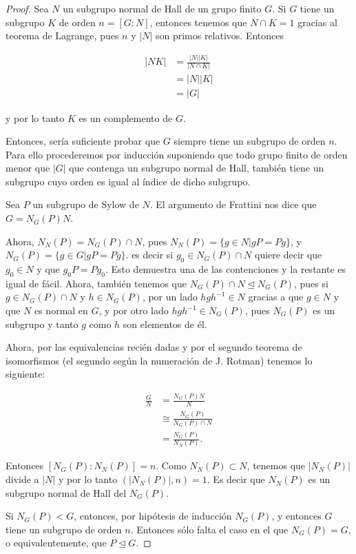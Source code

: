 \begin{proof}
    Sea $N$ un subgrupo normal de Hall de un grupo finito $G$. Si $G$ tiene un subgrupo $K$ de orden $n = [G:N]$, entonces
    tenemos que $N \cap K = 1$ gracias al teorema de Lagrange, pues $n$ y $|N|$ son primos relativos. Entonces
    
    \begin{align}
        |NK|    &= \frac{|N||K|}{|N \cap K|}    \\
                &= |N||K|                       \\
                &= |G| 
    \end{align}
    
    y por lo tanto $K$ es un complemento de $G$.\par\null
    
    Entonces, sería suficiente probar que $G$ siempre tiene un subgrupo de orden $n$. Para ello procederemos por inducción
    suponiendo que todo grupo finito de orden menor que $|G|$ que contenga un subgrupo normal de Hall, también
    tiene un subgrupo cuyo orden es igual al índice de dicho subgrupo.\par\null
    
    Sea $P$ un subgrupo de Sylow de $N$. El argumento de Frattini nos dice que $G = N_G(P)N$.\par\null
    
    Ahora, $N_N(P) = N_G(P) \cap N$, pues $N_N(P) = \{ g\in N | gP = Pg \}$, y $N_G(P) = \{ g\in G | gP = Pg \}$. es decir
    si $g_0 \in N_G(P) \cap N$ quiere decir que $g_0 \in N$ y que $g_0P = Pg_0$. Esto demuestra una de las contenciones y la
    restante es igual de fácil. Ahora,  también tenemos que $N_G(P) \cap N \trianglelefteq N_G(P)$, pues si $g \in N_G(P) \cap N$ y
    $h \in N_G(P)$, por un lado $hgh^{-1} \in N$ gracias a que $g \in N$ y que $N$ es normal en $G$, y por otro lado 
    $hgh^{-1} \in N_G(P)$, pues $N_G(P)$ es un subgrupo y tanto $g$ como $h$ son elementos de él.\par\null
    
    Ahora, por las equivalencias recién dadas y por el segundo teorema de isomorfismos 
    (el segundo según la numeración de J. Rotman) tenemos lo siguiente:
    
    \begin{align}
            \frac{G}{N}     &=      \frac{N_G(P)N}{N}               \\
                            &\cong  \frac{N_G(P)}{N_G(P) \cap N}    \\
                            &=      \frac{N_G(P)}{N_N(P)}.
    \end{align}
    
    Entonces $[N_G(P) : N_N(P)] = n$. Como $N_N(P) \subset N$, tenemos que $|N_N(P)|$ divide a $|N|$ y por lo tanto
    $(|N_N(P)|, n) = 1$. Es decir que $N_N(P)$ es un subgrupo normal de Hall del $N_G(P)$.\par\null
    
    Si $N_G(P) < G$, entonces, por hipótesis de inducción $N_G(P)$, y entonces $G$ tiene un subgrupo de orden $n$. Entonces
    sólo falta el caso en el que $N_G(P) = G$, o equivalentemente, que $P \trianglelefteq G$.
\end{proof}